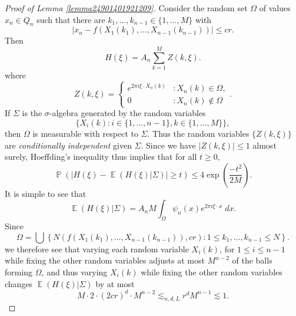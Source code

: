 \documentclass[dvipsnames,letterpaper,12pt]{article}
\numberwithin{equation}{section}
\numberwithin{theorem}{section}
\DeclareMathOperator{\EE}{\mathbb{E}}
\DeclareMathOperator{\PP}{\mathbb{P}}
\begin{document}
\begin{proof}[Proof of Lemma \ref{lemma24901401921209}]
    Consider the random set $\Omega$ of values $x_n \in Q_n$ such that there are $k_1,\dots,k_{n-1} \in \{ 1,\dots,M \}$ with
    \begin{equation}
        |x_n - f(X_1(k_1),\dots,X_{n-1}(k_{n-1}))| \leq cr.
    \end{equation}
    Then
    \begin{equation}
        H(\xi) = A_n \sum_{k = 1}^M Z(k,\xi).
    \end{equation}
    where
    \[ Z(k,\xi) = \begin{cases} e^{2 \pi i \xi \cdot X_n(k)} &: X_n(k) \in \Omega, \\ 0 &: X_n(k) \not \in \Omega \end{cases}. \]
    If $\Sigma$ is the $\sigma$-algebra generated by the random variables
    \[ \{ X_i(k) : i \in \{ 1, \dots, n-1 \}, k \in \{ 1, \dots, M \} \}, \]
    then $\Omega$ is measurable with respect to $\Sigma$. Thus the random variables $\{ Z(k,\xi) \}$ are \emph{conditionally independent} given $\Sigma$. Since we have $|Z(k,\xi)| \leq 1$ almost surely, Hoeffding's inequality thus implies that for all $t \geq 0$,
    \begin{equation} \label{equationCOIJCOIJX1232312}
        \PP \left( \left| H(\xi) - \EE(H(\xi)|\Sigma) \right| \geq t \right) \leq 4 \exp \left( \frac{-t^2}{2M} \right).
    \end{equation}
    It is simple to see that
    \begin{equation}
        \EE(H(\xi) | \Sigma) = A_n M \int_\Omega \psi_n(x) e^{2 \pi i \xi \cdot x}\; dx.
    \end{equation}
    Since
    \begin{equation}
        \Omega = \bigcup \left\{ N(f(X_1(k_1),\dots,X_{n-1}(k_{n-1})), cr) : 1 \leq k_1,\dots,k_{n-1} \leq N \right\}.
    \end{equation}
    we therefore see that varying each random variable $X_i(k)$, for $1 \leq i \leq n-1$ while fixing the other random variables adjusts at most $M^{n-2}$ of the balls forming $\Omega$, and thus varying $X_i(k)$ while fixing the other random variables changes $\EE(H(\xi)|\Sigma)$ by at most
    \begin{equation}
        M \cdot 2 \cdot (2cr)^d \cdot M^{n-2} \lesssim_{n,d,L} r^d M^{n-1} \lesssim 1.
    \end{equation}

\end{proof}
\end{document}
